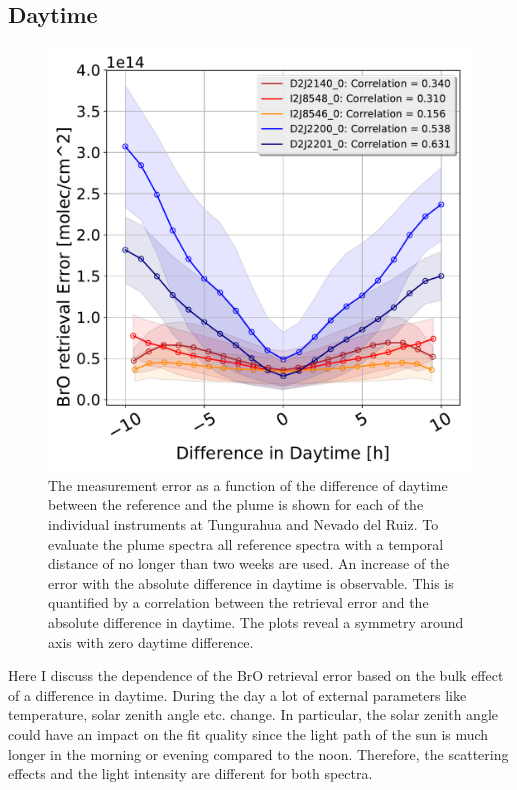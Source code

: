 \subsection{ Daytime \label{chap:daytime}}
\begin{figure}
	\centering
	\includegraphics[width=0.7\linewidth]{Bilder/DiffDaytimeallInstruments}
	\caption[The  measurement error as a function of the difference of daytime between the reference and the plume is shown for each of the individual instruments at Tungurahua and Nevado del Ruiz.]{The  measurement error as a function of the difference of daytime between the reference and the plume is shown for each of the individual instruments at Tungurahua and Nevado del Ruiz. To evaluate the plume spectra all reference spectra with a temporal distance of no longer than two weeks are used. An increase of the  error with the absolute difference in daytime is observable. This is quantified by a correlation between the  retrieval error and the absolute difference in daytime. The plots reveal a symmetry around axis with zero daytime difference. }
	\label{fig:diffdaytime}
\end{figure}
Here I discuss the dependence of the BrO retrieval error based on the bulk effect of a difference in daytime. During the day a lot of external parameters like temperature, solar zenith angle etc. change. In particular, the solar zenith angle could have an impact on the fit quality since the light path of the sun is much longer in the morning or evening compared to the noon. Therefore, the scattering effects and the light intensity are different for both spectra.\\

